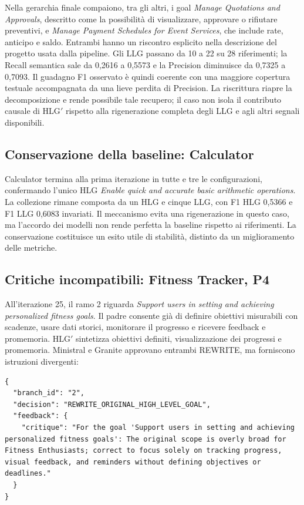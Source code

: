 Nella gerarchia finale compaiono, tra gli altri, i goal
\emph{Manage Quotations and Approvals}, descritto come la possibilit\`a
di visualizzare, approvare o rifiutare preventivi, e
\emph{Manage Payment Schedules for Event Services}, che include
rate, anticipo e saldo. Entrambi hanno un riscontro esplicito nella
descrizione del progetto usata dalla pipeline.
Gli LLG passano da 10 a 22 su 28 riferimenti; la Recall semantica
sale da 0,2616 a 0,5573 e la Precision diminuisce da 0,7325 a 0,7093.
Il guadagno F1 osservato \`e quindi coerente con una maggiore copertura
testuale accompagnata da una lieve perdita di Precision. La
riscrittura riapre la decomposizione e rende possibile tale recupero;
il caso non isola il contributo causale di HLG$'$ rispetto alla
rigenerazione completa degli LLG e agli altri segnali disponibili.

\subsection{Conservazione della baseline: Calculator}
Calculator termina alla prima iterazione in tutte e tre le
configurazioni, confermando l'unico HLG
\emph{Enable quick and accurate basic arithmetic operations}.
La collezione rimane composta da un HLG e cinque LLG, con F1 HLG
0,5366 e F1 LLG 0,6083 invariati. Il meccanismo evita una rigenerazione
in questo caso, ma l'accordo dei modelli non rende perfetta la
baseline rispetto ai riferimenti. La conservazione costituisce un
esito utile di stabilit\`a, distinto da un miglioramento delle metriche.

\subsection{Critiche incompatibili: Fitness Tracker, P4}
All'iterazione 25, il ramo 2 riguarda
\emph{Support users in setting and achieving personalized fitness goals}.
Il padre consente gi\`a di definire obiettivi misurabili con scadenze,
usare dati storici, monitorare il progresso e ricevere feedback e
promemoria. HLG$'$ sintetizza obiettivi definiti, visualizzazione dei
progressi e promemoria. Ministral e Granite approvano entrambi
REWRITE, ma forniscono istruzioni divergenti:

\begin{lstlisting}[style=llmjson,caption={Decisione reale di Ministral: Fitness Tracker, P4, iterazione 25, ramo 2.},label={lst:results-fitness-ministral}]
{
  "branch_id": "2",
  "decision": "REWRITE_ORIGINAL_HIGH_LEVEL_GOAL",
  "feedback": {
    "critique": "For the goal 'Support users in setting and achieving personalized fitness goals': The original scope is overly broad for Fitness Enthusiasts; correct to focus solely on tracking progress, visual feedback, and reminders without defining objectives or deadlines."
  }
}
\end{lstlisting}


